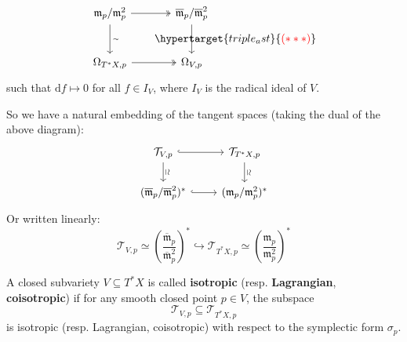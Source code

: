 \[
    \begin{tikzcd}[row sep=large, column sep=large]
        \mathfrak m_p/\mathfrak m_p^2 \arrow[r, twoheadrightarrow] \arrow[d, "\wr" sloped] & \overline{\mathfrak m}_p/\overline{\mathfrak m}_p^2 \arrow[d, "\wr" sloped] \\
        \Omega_{T^{\ast}X, p} \arrow[r, twoheadrightarrow] & \Omega_{V, p}
        \arrow[from=1-2, to=2-2, phantom, "\hypertarget{triple_ast}{\textcolor{red}{(* * *)}}"{xshift=4em}]
    \end{tikzcd}
\]
such that $\text{d}f \mapsto 0$ for all $f \in I_V$, where $I_V$ is the radical ideal of $V$.

\vspace{1em}

So we have a natural embedding of the tangent spaces (taking the dual of the above diagram):
\[
    \begin{tikzcd}
        \mathcal{T}_{V, p} \arrow[r, hook] \arrow[d, "\simeq" sloped] & \mathcal{T}_{T^{\ast}X, p} \arrow[d, "\simeq" sloped] \\
        (\overline{\mathfrak m}_p/\overline{\mathfrak m}_p^2)^{\ast} \arrow[r, hook] & (\mathfrak m_p/\mathfrak m_p^2)^{\ast}
    \end{tikzcd}
\]
Or written linearly:
\[
    \mathcal{T}_{V,p} \simeq \left(\frac{\overline{\mathfrak m}_p}{\overline{\mathfrak m}_p^2}\right)^{\ast} \hookrightarrow \mathcal{T}_{T^{\ast}X,p} \simeq \left(\frac{\mathfrak m_p}{\mathfrak m_p^2}\right)^{\ast}
\]



\begin{definition}
    A closed subvariety $V \subseteq T^{\ast}X$ is called \textbf{isotropic} (resp. \textbf{Lagrangian}, \textbf{coisotropic}) if for any smooth closed point $p \in V$, the subspace
    \[
        \mathcal{T}_{V,p} \subseteq \mathcal{T}_{T^{\ast}X, p}
    \]
    is isotropic (resp. Lagrangian, coisotropic) with respect to the symplectic form $\sigma_p$.
\end{definition}

